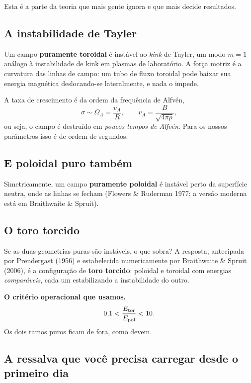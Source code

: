 \documentclass[11pt,a4paper]{article}
\begin{document}
Esta é a parte da teoria que mais gente ignora e que mais decide resultados.

\subsection{A instabilidade de Tayler}

Um campo \textbf{puramente toroidal} é instável ao \emph{kink} de Tayler, um
modo $m=1$ análogo à instabilidade de kink em plasmas de laboratório. A força
motriz é a curvatura das linhas de campo: um tubo de fluxo toroidal pode baixar
sua energia magnética deslocando-se lateralmente, e nada o impede.

A taxa de crescimento é da ordem da frequência de Alfvén,
\begin{equation}
\sigma \sim \Omega_A = \frac{v_A}{R},
\qquad
v_A = \frac{B}{\sqrt{4\pi\rho}} ,
\end{equation}
ou seja, o campo é destruído em \emph{poucos tempos de Alfvén}. Para os nossos
parâmetros isso é de ordem de segundos.

\subsection{E poloidal puro também}

Simetricamente, um campo \textbf{puramente poloidal} é instável perto da
superfície neutra, onde as linhas se fecham (Flowers \& Ruderman 1977; a versão
moderna está em Braithwaite \& Spruit).

\subsection{O toro torcido}

Se as duas geometrias puras são instáveis, o que sobra? A resposta, antecipada
por Prendergast (1956) e estabelecida numericamente por Braithwaite \& Spruit
(2006), é a configuração de \textbf{toro torcido}: poloidal e toroidal com
energias \emph{comparáveis}, cada um estabilizando a instabilidade do outro.

\begin{caixa}
\textbf{O critério operacional que usamos.}
\begin{equation}
0{,}1 < \frac{E_{\rm tor}}{E_{\rm pol}} < 10 .
\end{equation}
Os dois ramos puros ficam de fora, como devem.
\end{caixa}

\subsection{A ressalva que você precisa carregar desde o primeiro dia}
\end{document}
